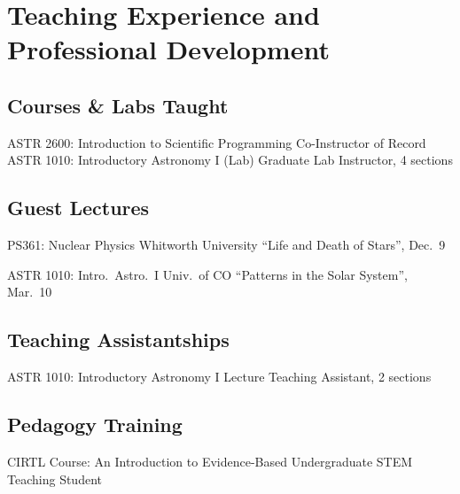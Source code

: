 \section{Teaching Experience and Professional Development}

\subsection{Courses \& Labs Taught}

		{ASTR 2600: Introduction to Scientific Programming}
		{Co-Instructor of Record}
		{}
		{}
        {}
        {ASTR 1010: Introductory Astronomy I (Lab)}
        {Graduate Lab Instructor, 4 sections}
        {}
        {}
        {}

\vspace{0.1cm}
\subsection{Guest Lectures}

        {PS361: Nuclear Physics}
        {Whitworth University}
        {``Life and Death of Stars'', Dec.~9}
        {}
        {}

        {ASTR 1010: Intro.~Astro.~I}
        {Univ.~of CO}
        {``Patterns in the Solar System'', Mar.~10}
        {}
        {}





\vspace{0.1cm}
\subsection{Teaching Assistantships}

        {ASTR 1010: Introductory Astronomy I}
        {Lecture Teaching Assistant, 2 sections}
        {}
        {}
        {}

\vspace{0.1cm}
\subsection{Pedagogy Training}

        {CIRTL Course: An Introduction to Evidence-Based Undergraduate STEM Teaching}
        {Student}
        {}{}{}

